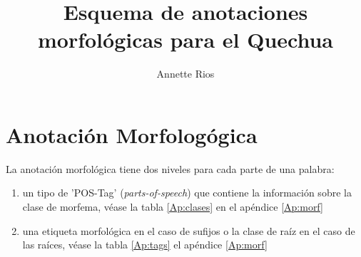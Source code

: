 \documentclass[a4paper,10pt]{scrartcl}
\title{Esquema de anotaciones morfol\'ogicas para el Quechua}
\author{Annette Rios}
\begin{document}
\maketitle

\begin{abstract}

\end{abstract}

\section{Anotaci\'on Morfolog\'ogica}

La anotaci\'on morfol\'ogica tiene dos niveles para cada parte de una palabra:\\
\begin{enumerate}
 \item un tipo de 'POS-Tag' (\emph{parts-of-speech}) que contiene la informaci\'on sobre la clase de morfema, v\'ease la tabla \ref{Ap:clases} en el ap\'endice \ref{Ap:morf}
  \item una etiqueta morfol\'ogica en el caso de sufijos o la clase de ra\'iz en el caso de las ra\'ices, v\'ease la tabla \ref{Ap:tags} el ap\'endice \ref{Ap:morf}
\end{enumerate}
\end{document}
